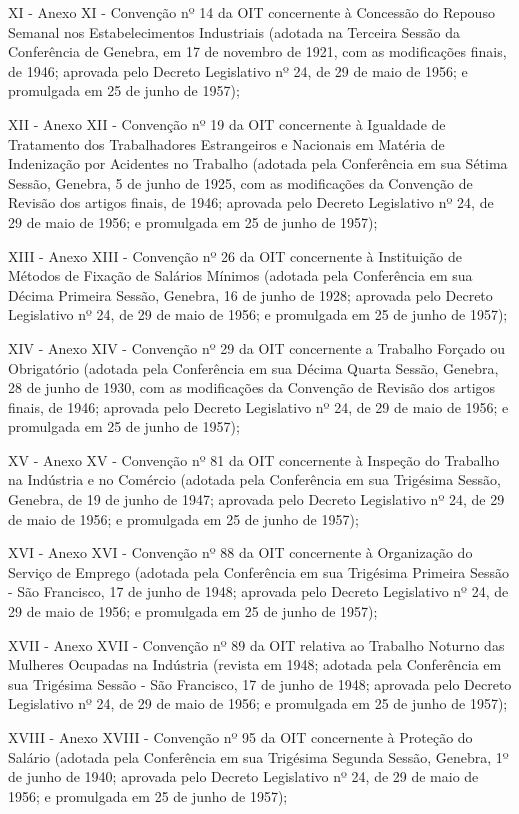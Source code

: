 \documentclass[
]{book}
\begin{document}
XI - Anexo XI - Convenção nº 14 da OIT concernente à Concessão do Repouso Semanal nos Estabelecimentos Industriais (adotada na Terceira Sessão da Conferência de Genebra, em 17 de novembro de 1921, com as modificações finais, de 1946; aprovada pelo Decreto Legislativo nº 24, de 29 de maio de 1956; e promulgada em 25 de junho de 1957);

XII - Anexo XII - Convenção nº 19 da OIT concernente à Igualdade de Tratamento dos Trabalhadores Estrangeiros e Nacionais em Matéria de Indenização por Acidentes no Trabalho (adotada pela Conferência em sua Sétima Sessão, Genebra, 5 de junho de 1925, com as modificações da Convenção de Revisão dos artigos finais, de 1946; aprovada pelo Decreto Legislativo nº 24, de 29 de maio de 1956; e promulgada em 25 de junho de 1957);

XIII - Anexo XIII - Convenção nº 26 da OIT concernente à Instituição de Métodos de Fixação de Salários Mínimos (adotada pela Conferência em sua Décima Primeira Sessão, Genebra, 16 de junho de 1928; aprovada pelo Decreto Legislativo nº 24, de 29 de maio de 1956; e promulgada em 25 de junho de 1957);

XIV - Anexo XIV - Convenção nº 29 da OIT concernente a Trabalho Forçado ou Obrigatório (adotada pela Conferência em sua Décima Quarta Sessão, Genebra, 28 de junho de 1930, com as modificações da Convenção de Revisão dos artigos finais, de 1946; aprovada pelo Decreto Legislativo nº 24, de 29 de maio de 1956; e promulgada em 25 de junho de 1957);

XV - Anexo XV - Convenção nº 81 da OIT concernente à Inspeção do Trabalho na Indústria e no Comércio (adotada pela Conferência em sua Trigésima Sessão, Genebra, de 19 de junho de 1947; aprovada pelo Decreto Legislativo nº 24, de 29 de maio de 1956; e promulgada em 25 de junho de 1957);

XVI - Anexo XVI - Convenção nº 88 da OIT concernente à Organização do Serviço de Emprego (adotada pela Conferência em sua Trigésima Primeira Sessão - São Francisco, 17 de junho de 1948; aprovada pelo Decreto Legislativo nº 24, de 29 de maio de 1956; e promulgada em 25 de junho de 1957);

XVII - Anexo XVII - Convenção nº 89 da OIT relativa ao Trabalho Noturno das Mulheres Ocupadas na Indústria (revista em 1948; adotada pela Conferência em sua Trigésima Sessão - São Francisco, 17 de junho de 1948; aprovada pelo Decreto Legislativo nº 24, de 29 de maio de 1956; e promulgada em 25 de junho de 1957);

XVIII - Anexo XVIII - Convenção nº 95 da OIT concernente à Proteção do Salário (adotada pela Conferência em sua Trigésima Segunda Sessão, Genebra, 1º de junho de 1940; aprovada pelo Decreto Legislativo nº 24, de 29 de maio de 1956; e promulgada em 25 de junho de 1957);
\end{document}
